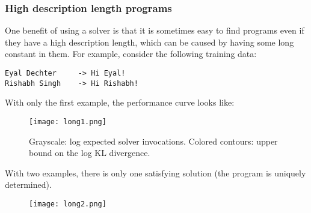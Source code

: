 \documentclass{article}
\begin{document}
\subsubsection{High description length programs}
One benefit of using a solver is that it is sometimes easy to find programs even if they have a high description length,
which can be caused by having some long constant in them.
For example, consider the following training data:
\begin{verbatim}
Eyal Dechter     -> Hi Eyal!
Rishabh Singh    -> Hi Rishabh!
\end{verbatim}

With only the first example, the performance curve looks like:
\begin{figure}
  \texttt{[image: long1.png]}
  \caption{Grayscale: log expected solver invocations. Colored contours: upper bound on the log KL divergence. }
\end{figure}

With two examples, there is only one satisfying solution (the program is uniquely determined).
\begin{figure}
  \texttt{[image: long2.png]}  
\end{figure}
\end{document}
